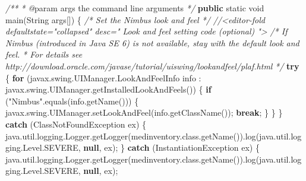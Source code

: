 \documentclass[
  10pt,
]{article}
\newenvironment{Shaded}{}{}
\newcommand{\BuiltInTok}[1]{\textcolor[rgb]{0.00,0.50,0.00}{#1}}
\newcommand{\CommentTok}[1]{\textcolor[rgb]{0.38,0.63,0.69}{\textit{#1}}}
\newcommand{\ControlFlowTok}[1]{\textcolor[rgb]{0.00,0.44,0.13}{\textbf{#1}}}
\newcommand{\DataTypeTok}[1]{\textcolor[rgb]{0.56,0.13,0.00}{#1}}
\newcommand{\FunctionTok}[1]{\textcolor[rgb]{0.02,0.16,0.49}{#1}}
\newcommand{\KeywordTok}[1]{\textcolor[rgb]{0.00,0.44,0.13}{\textbf{#1}}}
\newcommand{\NormalTok}[1]{#1}
\newcommand{\OperatorTok}[1]{\textcolor[rgb]{0.40,0.40,0.40}{#1}}
\newcommand{\StringTok}[1]{\textcolor[rgb]{0.25,0.44,0.63}{#1}}
\begin{document}
\begin{Shaded}
\begin{Highlighting}[numbers=left,,]
    \CommentTok{/**}
\CommentTok{     * @}\NormalTok{param args the command line arguments}
     \CommentTok{*/}
    \KeywordTok{public} \DataTypeTok{static} \DataTypeTok{void} \FunctionTok{main}\OperatorTok{(}\BuiltInTok{String}\NormalTok{ args}\OperatorTok{[])} \OperatorTok{\{}
        \CommentTok{/* Set the Nimbus look and feel */}
        \CommentTok{//\textless{}editor{-}fold defaultstate="collapsed" desc=" Look and feel setting code (optional) "\textgreater{}}
        \CommentTok{/* If Nimbus (introduced in Java SE 6) is not available, stay with the default look and feel.}
\CommentTok{         * For details see http://download.oracle.com/javase/tutorial/uiswing/lookandfeel/plaf.html }
\CommentTok{         */}
        \ControlFlowTok{try} \OperatorTok{\{}
            \ControlFlowTok{for} \OperatorTok{(}\NormalTok{javax}\OperatorTok{.}\FunctionTok{swing}\OperatorTok{.}\FunctionTok{UIManager}\OperatorTok{.}\FunctionTok{LookAndFeelInfo}\NormalTok{ info }\OperatorTok{:}\NormalTok{ javax}\OperatorTok{.}\FunctionTok{swing}\OperatorTok{.}\FunctionTok{UIManager}\OperatorTok{.}\FunctionTok{getInstalledLookAndFeels}\OperatorTok{())} \OperatorTok{\{}
                \ControlFlowTok{if} \OperatorTok{(}\StringTok{"Nimbus"}\OperatorTok{.}\FunctionTok{equals}\OperatorTok{(}\NormalTok{info}\OperatorTok{.}\FunctionTok{getName}\OperatorTok{()))} \OperatorTok{\{}
\NormalTok{                    javax}\OperatorTok{.}\FunctionTok{swing}\OperatorTok{.}\FunctionTok{UIManager}\OperatorTok{.}\FunctionTok{setLookAndFeel}\OperatorTok{(}\NormalTok{info}\OperatorTok{.}\FunctionTok{getClassName}\OperatorTok{());}
                    \ControlFlowTok{break}\OperatorTok{;}
                \OperatorTok{\}}
            \OperatorTok{\}}
        \OperatorTok{\}} \ControlFlowTok{catch} \OperatorTok{(}\BuiltInTok{ClassNotFoundException}\NormalTok{ ex}\OperatorTok{)} \OperatorTok{\{}
\NormalTok{            java}\OperatorTok{.}\FunctionTok{util}\OperatorTok{.}\FunctionTok{logging}\OperatorTok{.}\FunctionTok{Logger}\OperatorTok{.}\FunctionTok{getLogger}\OperatorTok{(}\NormalTok{medinventory}\OperatorTok{.}\FunctionTok{class}\OperatorTok{.}\FunctionTok{getName}\OperatorTok{()).}\FunctionTok{log}\OperatorTok{(}\NormalTok{java}\OperatorTok{.}\FunctionTok{util}\OperatorTok{.}\FunctionTok{logging}\OperatorTok{.}\FunctionTok{Level}\OperatorTok{.}\FunctionTok{SEVERE}\OperatorTok{,} \KeywordTok{null}\OperatorTok{,}\NormalTok{ ex}\OperatorTok{);}
        \OperatorTok{\}} \ControlFlowTok{catch} \OperatorTok{(}\BuiltInTok{InstantiationException}\NormalTok{ ex}\OperatorTok{)} \OperatorTok{\{}
\NormalTok{            java}\OperatorTok{.}\FunctionTok{util}\OperatorTok{.}\FunctionTok{logging}\OperatorTok{.}\FunctionTok{Logger}\OperatorTok{.}\FunctionTok{getLogger}\OperatorTok{(}\NormalTok{medinventory}\OperatorTok{.}\FunctionTok{class}\OperatorTok{.}\FunctionTok{getName}\OperatorTok{()).}\FunctionTok{log}\OperatorTok{(}\NormalTok{java}\OperatorTok{.}\FunctionTok{util}\OperatorTok{.}\FunctionTok{logging}\OperatorTok{.}\FunctionTok{Level}\OperatorTok{.}\FunctionTok{SEVERE}\OperatorTok{,} \KeywordTok{null}\OperatorTok{,}\NormalTok{ ex}\OperatorTok{);}

\end{Highlighting}
\end{Shaded}
\end{document}
